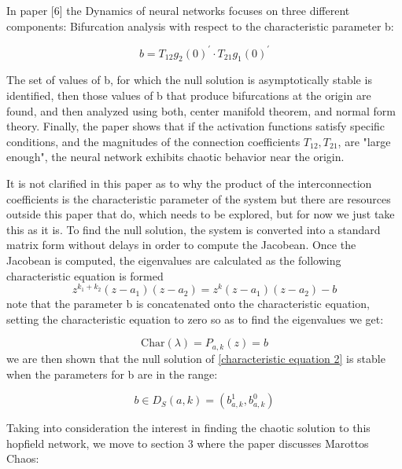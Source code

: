 \documentclass[12pt, letterpaper]{article}
\begin{document}
In paper [6] the Dynamics of neural networks focuses on three different components: Bifurcation analysis with respect to the characteristic parameter b:

\begin{equation}\label{b defintion}
b = T_{12}g_{2}(0)^{'} \cdot T_{21}g_{1}(0)^{'}
\end{equation}

The set of values of b, for which the null solution is asymptotically stable is identified, then those values of b that produce bifurcations at the origin are found, and then analyzed using both, center manifold theorem, and normal form theory. Finally, the paper shows that if the activation functions satisfy specific conditions, and the magnitudes of the connection coefficients \(T_{12}, T_{21}\), are "large enough", the neural network exhibits chaotic behavior near the origin.

It is not clarified in this paper as to why the product of the interconnection coefficients is the characteristic parameter of the system but there are resources outside this paper that do, which needs to be explored, but for now we just take this as it is. To find the null solution, the system is converted into a standard matrix form without delays in order to compute the Jacobean. Once the Jacobean is computed, the eigenvalues are calculated as the following characteristic equation is formed
\begin{equation}\label{characteristic equation 1}
z^{k_{1} + k_{2}}(z - a_{1})(z - a_{2})  = z^{k}(z - a_{1})(z - a_{2}) - b
\end{equation}
note that the parameter b is concatenated onto the characteristic equation, setting the characteristic equation to zero so as to find the eigenvalues we get:

\begin{equation}\label{characteristic equation 2}
    \text{Char}(\lambda) = P_{a,k}(z) = b
\end{equation}
we are then shown that the null solution of \ref{characteristic equation 2} is stable when the parameters for b are in the range:

\begin{equation}\label{Null Solution Stability}
    b \in D_{S}(a,k) = (b_{a,k}^{1}, b_{a,k}^{0})
\end{equation}

Taking into consideration the interest in finding the chaotic solution to this hopfield network, we move to section 3 where the paper discusses Marottos Chaos:
\end{document}
